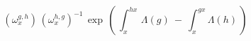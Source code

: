 \begin{equation}  \label{good1loop}
\left( \omega^{g,h}_x \right) \,
\left( \omega^{h,g}_x \right)^{-1} \,
\exp \, \left( \, \int^{hx}_x \, \Lambda(g) \: - \:
\int^{gx}_x \Lambda(h) \, \right)
\end{equation}

